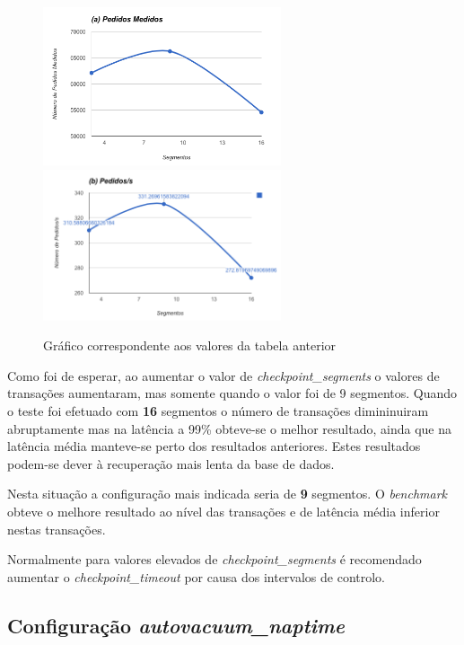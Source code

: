 \begin{figure}[ht!]
\centering
\includegraphics[width=70mm]{img/03_cs_a.png}
\includegraphics[width=70mm]{img/03_cs_b.png}
\caption{Gráfico correspondente aos valores da tabela anterior\label{overflow}}
\end{figure}

Como foi de esperar, ao aumentar o valor de \textit{checkpoint\_segments} o valores de transações aumentaram, mas somente quando o valor foi de 9 segmentos. Quando o teste foi efetuado com \textbf{16} segmentos o número de transações dimininuiram abruptamente mas na latência a 99\% obteve-se o melhor resultado, ainda que na latência média manteve-se perto dos resultados anteriores. Estes resultados podem-se dever à recuperação mais lenta da base de dados.

Nesta situação a configuração mais indicada seria de \textbf{9} segmentos. O \textit{benchmark} obteve o melhore resultado ao nível das transações e de latência média inferior nestas transações.

Normalmente para valores elevados de \textit{checkpoint\_segments} é recomendado aumentar o \textit{checkpoint\_timeout} por causa dos intervalos de controlo.

\newpage

\subsection{Configuração \textit{autovacuum\_naptime}}

